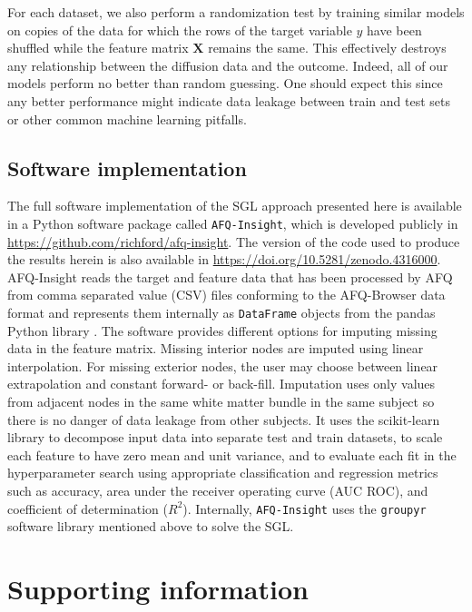 \documentclass[10pt,letterpaper]{article}
\begin{document}
For each dataset, we also perform a randomization test by training similar
models on copies of the data for which the rows of the target variable $y$
have been shuffled while the feature matrix $\mathbf{X}$ remains the same.
This effectively destroys any relationship between the diffusion data and the
outcome. Indeed, all of our models perform no better than random guessing.
One should expect this since any better performance might indicate data
leakage between train and test sets \cite{kaufman2012leakage} or other common
machine learning pitfalls.

\subsection*{Software implementation}

The full software implementation of the SGL approach presented here is available
in a Python software package called \texttt{AFQ-Insight}, which is developed
publicly in \url{https://github.com/richford/afq-insight}.
The version of the code used to produce the results herein is also available in
\url{https://doi.org/10.5281/zenodo.4316000}.
AFQ-Insight reads the target and feature data that has been processed by AFQ
from comma separated value (CSV) files conforming to the AFQ-Browser data
format \cite{yeatman2018browser} and represents them internally as
\lstinline|DataFrame| objects from the pandas Python library
\cite{mckinney2010data}. The software provides different options for imputing
missing data in the feature matrix. Missing interior nodes are imputed using
linear interpolation. For missing exterior nodes, the user may choose between
linear extrapolation and constant forward- or back-fill. Imputation uses only
values from adjacent nodes in the same white matter bundle in the same
subject so there is no danger of data leakage from other subjects. It uses
the scikit-learn \cite{scikit-learn} library to decompose input data into
separate test and train datasets, to scale each feature to have zero mean and
unit variance, and to evaluate each fit in the hyperparameter search using
appropriate classification and regression metrics such as accuracy, area
under the receiver operating curve (AUC ROC), and coefficient of
determination ($R^2$). Internally, \texttt{AFQ-Insight} uses the
\texttt{groupyr} software library \cite{groupyr} mentioned above to solve the
SGL.

\section*{Supporting information}
\end{document}
